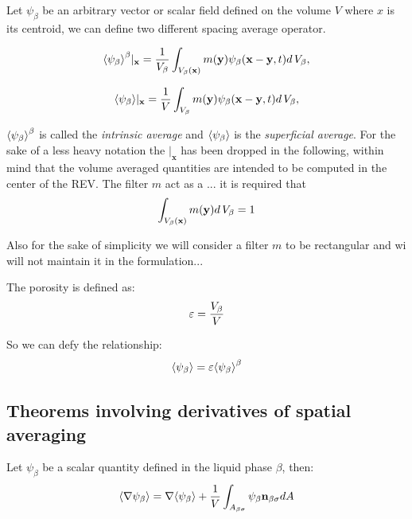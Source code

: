 Let $\psi_{\beta}$ be an arbitrary vector or scalar field defined on the volume $V$ where $x$ is its centroid, we can define two different spacing average operator.

\begin{equation}
{\left< \psi_{\beta} \right>}^{\beta}|_{\mathbf{x}} = \dfrac{1}{V_\beta} \int_{V_\beta(\mathbf{x})}  m(\mathbf{y}) \psi_{\beta}(\mathbf{x}-\mathbf{y}, t) d \, V_\beta,
\label{eq:avg_intrinsic}
\end{equation}

\begin{equation}
{\left< \psi_{\beta} \right>}|_{\mathbf{x}} = \dfrac{1}{V} \int_{V_\beta} m(\mathbf{y}) \psi_{\beta}(\mathbf{x}-\mathbf{y}, t) d \, V_\beta,
\label{eq:avg_superficial}
\end{equation}

${\left< \psi_{\beta} \right>}^{\beta}$ is called the \textit{intrinsic average} and ${\left< \psi_{\beta} \right>}$ is the \textit{superficial average}.
For the sake of a less heavy notation the $|_{\mathbf{x}}$ has been dropped in the following, within mind that the volume averaged quantities are intended to be computed in the center of the REV.
The filter $m$ act as a ... it is required that
$$
\int_{V_\beta(\mathbf{x})}  m(\mathbf{y}) d \, V_\beta = 1
$$

Also for the sake of simplicity we will consider a filter $m$ to be rectangular and wi will not maintain it in the formulation...

The porosity is defined as:
\begin{equation}
	\varepsilon = \dfrac{V_\beta}{V}
	\label{eq:porosity}
\end{equation}

So we can defy the relationship:
\begin{equation}
	{\left< \psi_{\beta} \right>} =  \varepsilon {\left< \psi_{\beta} \right>}^{\beta}
\end{equation}

\subsection{Theorems involving derivatives of spatial averaging}

\begin{theorem}
Let $\psi_{\beta}$ be a scalar quantity defined in the liquid phase $\beta$, then:
	\begin{equation}
		{\left< \nabla \psi_{\beta} \right>} = \nabla {\left< \psi_{\beta} \right>} + \dfrac{1}{V} \int_{A_{\beta \sigma}} \psi_{\beta} \mathbf{n}_{\beta \sigma}  dA
		\label{th:spat_avg}
	\end{equation}
\end{theorem}


